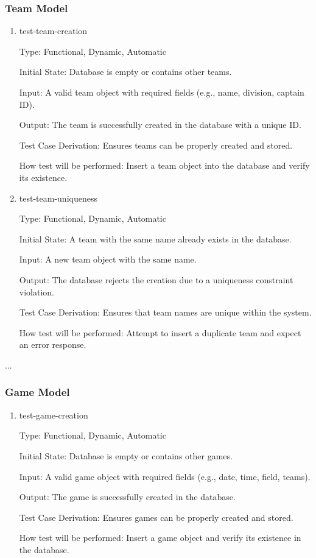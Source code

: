 \documentclass[12pt, titlepage]{article}
\begin{document}
\subsubsection{Team Model}

\begin{enumerate}

    \item{test-team-creation\\}

    Type: Functional, Dynamic, Automatic

    Initial State: Database is empty or contains other teams.

    Input: A valid team object with required fields (e.g., name, division, captain ID).

    Output: The team is successfully created in the database with a unique ID.

    Test Case Derivation: Ensures teams can be properly created and stored.

    How test will be performed: Insert a team object into the database and verify its existence.

\item{test-team-uniqueness\\}

    Type: Functional, Dynamic, Automatic

    Initial State: A team with the same name already exists in the database.

    Input: A new team object with the same name.

    Output: The database rejects the creation due to a uniqueness constraint violation.

    Test Case Derivation: Ensures that team names are unique within the system.

    How test will be performed: Attempt to insert a duplicate team and expect an error response.

\end{enumerate}

...\subsubsection{Game Model}

\begin{enumerate}

    \item{test-game-creation\\}

    Type: Functional, Dynamic, Automatic

    Initial State: Database is empty or contains other games.

    Input: A valid game object with required fields (e.g., date, time, field, teams).

    Output: The game is successfully created in the database.

    Test Case Derivation: Ensures games can be properly created and stored.

    How test will be performed: Insert a game object and verify its existence in the database.

\end{enumerate}
\end{document}
